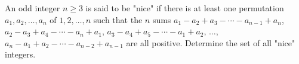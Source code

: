 An odd integer $n \geq 3$ is said to be "nice" if there is at least one permutation $a_1, a_2, \ldots, a_n$ of $1, 2, \ldots, n$ such that the $n$ sums $a_1 - a_2 + a_3 - \cdots - a_{n-1} + a_n$, $a_2 - a_3 + a_4 - \cdots - a_n + a_1$, $a_3 - a_4 + a_5 - \cdots - a_1 + a_2$, $\ldots$, $a_n - a_1 + a_2 - \cdots - a_{n-2} + a_{n-1}$ are all positive. Determine the set of all "nice" integers.
